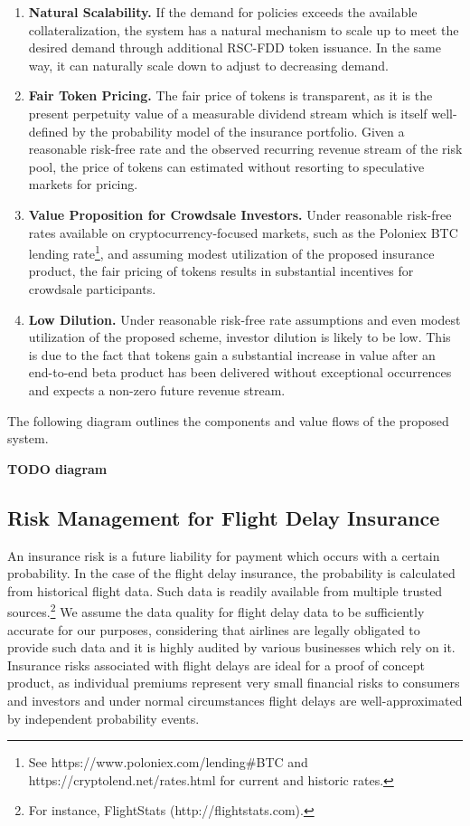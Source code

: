 \documentclass[12pt]{article}
\begin{document}
\begin{enumerate}
    \item \textbf{Natural Scalability.} If the demand for policies exceeds the available collateralization, the system has a natural mechanism to scale up to meet the desired demand through additional RSC-FDD token issuance. In the same way, it can naturally scale down to adjust to decreasing demand.

    \item \textbf{Fair Token Pricing.} The fair price of tokens is transparent, as it is the present perpetuity value of a measurable dividend stream which is itself well-defined by the probability model of the insurance portfolio. Given a reasonable risk-free rate and the observed recurring revenue stream of the risk pool, the price of tokens can estimated without resorting to speculative markets for pricing.

    \item \textbf{Value Proposition for Crowdsale Investors.} Under reasonable risk-free rates available on cryptocurrency-focused markets, such as the Poloniex BTC lending rate\footnote{ See https://www.poloniex.com/lending#BTC and https://cryptolend.net/rates.html for current and historic rates.}, and assuming modest utilization of the proposed insurance product, the fair pricing of tokens results in substantial incentives for crowdsale participants.

    \item \textbf{Low Dilution.} Under reasonable risk-free rate assumptions and even modest utilization of the proposed scheme, investor dilution is likely to be low. This is due to the fact that tokens gain a substantial increase in value after an end-to-end beta product has been delivered without exceptional occurrences and expects a non-zero future revenue stream.
\end{enumerate}

The following diagram outlines the components and value flows of the proposed system.

\textbf{TODO diagram}

\subsection{Risk Management for Flight Delay Insurance}

An insurance risk is a future liability for payment which occurs with a certain probability. In the case of the flight delay insurance, the probability is calculated from historical flight data. Such data is readily available from multiple trusted sources.\footnote{For instance, FlightStats (http://flightstats.com).} We assume the data quality for flight delay data to be sufficiently accurate for our purposes, considering that airlines are legally obligated to provide such data and it is highly audited by various businesses which rely on it. Insurance risks associated with flight delays are ideal for a proof of concept product, as individual premiums represent very small financial risks to consumers and investors and under normal circumstances flight delays are well-approximated by independent probability events.
\end{document}
